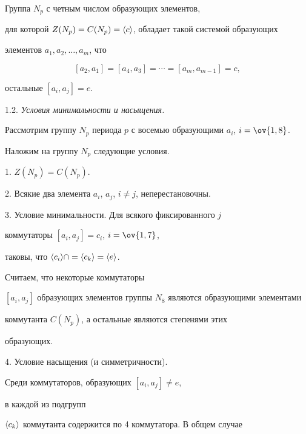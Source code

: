 \begin{thm}


Группа $N_p$ с четным числом образующих элементов,


для которой $Z(N_p)=C(N_p)=\langle c\rangle$, обладает такой системой образующих 


элементов $a_1,a_2,\dotsc,a_m$, что


$$


[a_2,a_1]=[a_4,a_3]=\dotsb=[a_m,a_{m-1}]=c,


$$


остальные $[a_i,a_j]=e$.


\end{thm}





1.2. {\it Условия минимальности и насыщения.}


Рассмотрим группу $N_p$ периода $p$ с восемью образующими $a_i$, $i=\ov{1,8}$.


Наложим на группу $N_p$ следующие условия.





1. $Z(N_p)=C(N_p)$.





2. Всякие два элемента $a_i$, $a_j$, $i\ne j$, неперестановочны.





3. Условие минимальности. Для всякого фиксированного $j$ 


коммутаторы $[a_i,a_j]=c_i$, $i=\ov{1,7}$,


таковы, что $\langle c_i\rangle\cap=\langle c_k\rangle=\langle e\rangle$.


Считаем, что некоторые коммутаторы


$[a_i,a_j]$ образующих элементов группы $N_8$ являются образующими элементами 


коммутанта $C(N_p)$, а остальные являются степенями этих


образующих.





4. Условие насыщения (и симметричности).


Среди коммутаторов, образующих $[a_i,a_j]\ne e$,




в каждой из подгрупп


$\langle c_k\rangle$ коммутанта содержится по 4 коммутатора. В общем случае


